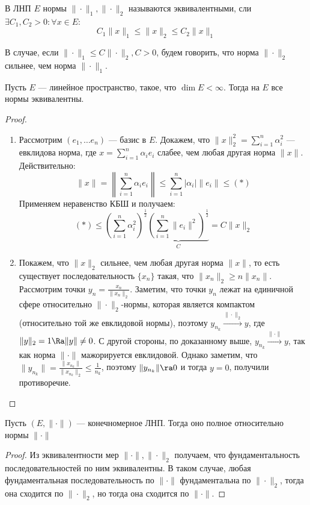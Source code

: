 
\begin{definition}
    В ЛНП \(E\) нормы \(\|\cdot\|_1, \|\cdot\|_2\) называются эквивалентными, сли \(\exists C_1, C_2 > 0: \forall x \in E:\)
    \[C_1\|x\|_1 \le \|x\|_2 \le C_2\|x\|_1\]
\end{definition}

\begin{note}
    В случае, если \(\|\cdot\|_1 \le C\|\cdot\|_2, C > 0\), будем говорить, что норма \(\|\cdot\|_2\) сильнее, чем норма \(\|\cdot\|_1\).
\end{note}

\begin{theorem}
    Пусть \(E\) --- линейное пространство, такое, что \(\dim E < \infty\). Тогда на \(E\) все нормы эквивалентны.
\end{theorem}
\begin{proof}
    \begin{enumerate}
        \item Рассмотрим \((e_1, \dots e_n)\) --- базис в \(E\). Докажем, что \(\|x\|^2_2 = \sum_{i = 1}^n \alpha_i^2\) --- евклидова норма, где \(x = \sum_{i = 1}^n \alpha_ie_i\) слабее, чем любая другая норма \(\|x\|\). Действительно:
        \[\|x\| = \left\| \sum_{i = 1}^n \alpha_ie_i \right\| \le \sum_{i = 1}^n|\alpha_i|\|e_i\| \le (*)\]
        Применяем неравенство КБШ и получаем:
        \[(*) \le \left( \sum_{i = 1}^n \alpha_i^2 \right)^\frac{1}{2}\underbrace{\left( \sum_{i = 1}^n \|e_i\|^2 \right)^\frac{1}{2}}_C = C\|x\|_2\]
        \item Покажем, что \(\|x\|_2\) сильнее, чем любая другая норма \(\|x\|\), то есть существует последовательность \(\{x_n\}\) такая, что \(\|x_n\|_2 \ge n\|x_n\|\). Рассмотрим точки \(y_n = \frac{x_n}{\|x_n\|_2}\). Заметим, что точки \(y_n\) лежат на единичной сфере относительно \(\|\cdot\|_2\)-нормы, которая является компактом (относительно той же евклидовой нормы), поэтому \(y_{n_k} \xrightarrow{\|\cdot\|_2} y\), где \(\|y\|_2 = 1 \Ra \|y\| \ne 0\). С другой стороны, по доказанному выше, \(y_{n_k} \xrightarrow{\|\cdot\|} y\), так как норма \(\|\cdot\|\) мажорируется евклидовой. Однако заметим, что \(\|y_{n_k}\| = \frac{\|x_{n_k}\|}{\|x_{n_k}\|_2} \le \frac{1}{n_k}\), поэтому \(\|y_{n_k}\| \ra 0\) и тогда \(y = 0\), получили противоречие.
    \end{enumerate}
\end{proof}

\begin{theorem}
    Пусть \((E, \|\cdot\|)\) --- конечномерное ЛНП. Тогда оно полное относительно нормы \(\|\cdot\|\)
\end{theorem}
\begin{proof}
    Из эквивалентности мер \(\|\cdot\|, \|\cdot\|_2\) получаем, что фундаментальность последовательностей по ним эквивалентны. В таком случае, любая фундаментальная последовательность по \(\|\cdot\|\) фундаментальна по \(\|\cdot\|_2\), тогда она сходится по \(\|\cdot\|_2\), но тогда она сходится по \(\|\cdot\|\).
\end{proof}

